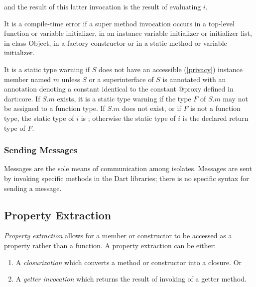 \documentclass{article}
\newcommand{\code}[1]{{\sf #1}}
\begin{document}
and the result of this latter invocation is the result of evaluating $i$.


\LMHash{}
It is a compile-time error if a super method invocation occurs in a top-level function or variable initializer, in an instance variable initializer or initializer list, in class \code{Object}, in a factory constructor or in a static method or variable initializer.

\LMHash{}
It is a static type warning if $S$ does not have an accessible (\ref{privacy}) instance member named $m$ unless $S$ or a superinterface of $S$ is annotated with an annotation denoting a constant identical to the constant \code{@proxy} defined in \code{dart:core}. If $S.m$ exists, it  is a static type warning if the type $F$ of $S.m$ may not be assigned to a function type. If $S.m$ does not exist, or if $F$ is not a function type, the static type of $i$ is \DYNAMIC{}; otherwise the static type of $i$ is the declared return type of  $F$.  




\subsubsection{Sending Messages}

\LMHash{}
Messages are the sole means of communication among isolates. Messages are sent by invoking specific  methods in the Dart libraries; there is no specific syntax for sending a message. 




\subsection{ Property Extraction}

\LMHash{}
{\em Property extraction} allows for a member or constructor to be accessed as a property rather than a function.
A property extraction can be either:
\begin{enumerate}
\item A {\em closurization} which converts a method or constructor into a closure. Or
\item A {\em getter invocation} which returns the result of invoking of a getter method.
\end{enumerate}
\end{document}
